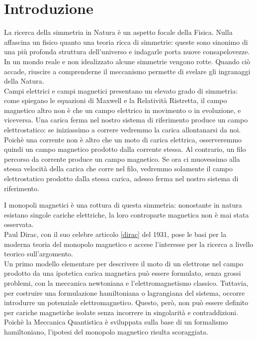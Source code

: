 

\chapter*{Introduzione}

La ricerca della simmetria in Natura è un aspetto focale della Fisica. Nulla
affascina un fisico quanto una teoria ricca di simmetrie: queste sono sinonimo
di una più profonda struttura dell'universo e indagarle porta nuove consapelovezze.
In un mondo reale e non idealizzato alcune simmetrie vengono rotte. Quando ciò
accade, riuscire a comprenderne il meccanismo permette di svelare gli ingranaggi
della Natura.\\

Campi elettrici e campi magnetici presentano un elevato grado di simmetria: come
spiegano le equazioni di Maxwell e la Relatività Ristretta, il campo magnetico
altro non è che un campo elettrico in movimento o in evoluzione, e viceversa.
Una carica ferma nel nostro sistema di riferimento produce un campo elettrostatico:
se iniziassimo a correre vedremmo la carica allontanarsi da noi. Poichè
una corrente non è altro che un moto di carica elettrica, osserveremmo quindi un campo
magnetico prodotto dalla corrente stessa.
Al contrario, un filo percorso da corrente produce un campo magnetico. Se ora ci muovessimo
alla stessa velocità della carica che corre nel filo, vedremmo solamente il campo
elettrostatico prodotto dalla stessa carica, adesso ferma nel nostro sistema di riferimento.

I monopoli magnetici è una rottura di questa simmetria: nonostante in natura
esistano singole cariche elettriche, la loro controparte magnetica non è mai
stata osservata.\\

Paul Dirac, con il suo celebre articolo \ref{dirac} del 1931, pose le basi per
la moderna teoria del monopolo magnetico e accese l'interesse per la ricerca a
livello teorico sull'argomento.\\
Un primo modello elementare per descrivere il moto di un elettrone
nel campo prodotto da una ipotetica carica magnetica può essere formulato,
senza grossi problemi, con la meccanica newtoniana e l'elettromagnetismo classico.
Tuttavia, per costruire una formulazione hamiltoniana o lagrangiana del sistema,
occorre introdurre un potenziale elettromagnetico. Questo, però, non può essere
definito per cariche magnetiche isolate senza incorrere in singolarità e contraddizioni.
Poichè la Meccanica Quantistica è sviluppata sulla base di un formalismo
hamiltoniano, l'ipotesi del monopolo magnetico risulta scoraggiata.


